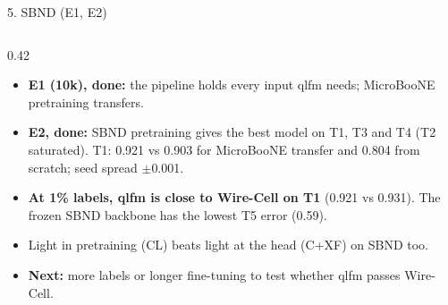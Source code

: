 \documentclass[aspectratio=169,10pt]{beamer}
\begin{document}
\begin{frame}{5. SBND (E1, E2)}
\begin{columns}[T]
\begin{column}{0.42\textwidth}
\begin{itemize}
        \item \textbf{E1 (10k), done:} the pipeline holds every input qlfm needs; MicroBooNE pretraining transfers.
        \item \textbf{E2, done:} SBND pretraining gives the best model on T1, T3 and T4 (T2 saturated). T1: 0.921 vs 0.903 for MicroBooNE transfer and 0.804 from scratch; seed spread $\pm$0.001.
        \item \textbf{At 1\% labels, qlfm is close to Wire-Cell on T1} (0.921 vs 0.931). The frozen SBND backbone has the lowest T5 error (0.59).
        \item Light in pretraining (CL) beats light at the head (C+XF) on SBND too.
        \item \textbf{Next:} more labels or longer fine-tuning to test whether qlfm passes Wire-Cell.
      \end{itemize}
    \end{column}
  \end{columns}
\end{frame}
\end{document}

